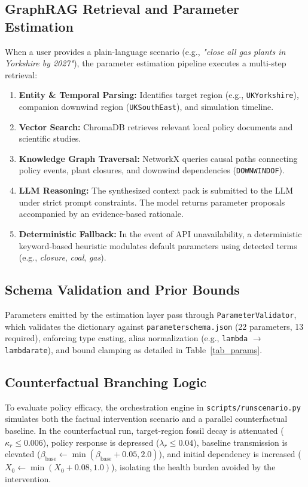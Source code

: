 \documentclass[conference]{IEEEtran}
\renewcommand{\_}{\textunderscore\allowbreak{}}%
\begin{document}
\subsection{GraphRAG Retrieval and Parameter Estimation}
When a user provides a plain-language scenario (e.g., \textit{"close all gas plants in Yorkshire by 2027"}), the parameter estimation pipeline executes a multi-step retrieval:
\begin{enumerate}
    \item \textbf{Entity \& Temporal Parsing:} Identifies target region (e.g., \texttt{UK\_Yorkshire}), companion downwind region (\texttt{UK\_SouthEast}), and simulation timeline.
    \item \textbf{Vector Search:} ChromaDB retrieves relevant local policy documents and scientific studies.
    \item \textbf{Knowledge Graph Traversal:} NetworkX queries causal paths connecting policy events, plant closures, and downwind dependencies (\texttt{DOWNWIND\_OF}).
    \item \textbf{LLM Reasoning:} The synthesized context pack is submitted to the LLM under strict prompt constraints. The model returns parameter proposals accompanied by an evidence-based rationale.
    \item \textbf{Deterministic Fallback:} In the event of API unavailability, a deterministic keyword-based heuristic modulates default parameters using detected terms (e.g., \textit{closure}, \textit{coal}, \textit{gas}).
\end{enumerate}

\subsection{Schema Validation and Prior Bounds}
Parameters emitted by the estimation layer pass through \texttt{ParameterValidator}, which validates the dictionary against \texttt{parameter\_schema.json} (22 parameters, 13 required), enforcing type casting, alias normalization (e.g., \texttt{lambda} $\to$ \texttt{lambda\_rate}), and bound clamping as detailed in Table~\ref{tab_params}.

\subsection{Counterfactual Branching Logic}
To evaluate policy efficacy, the orchestration engine in \texttt{scripts/run\_scenario.py} simulates both the factual intervention scenario and a parallel counterfactual baseline. In the counterfactual run, target-region fossil decay is attenuated ($\kappa_r \le 0.006$), policy response is depressed ($\lambda_r \le 0.04$), baseline transmission is elevated ($\beta_{\text{base}} \gets \min(\beta_{\text{base}} + 0.05, 2.0)$), and initial dependency is increased ($X_0 \gets \min(X_0 + 0.08, 1.0)$), isolating the health burden avoided by the intervention.
\end{document}
